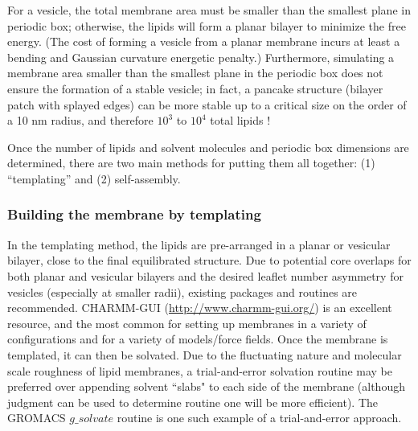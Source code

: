 \documentclass[9pt,bestpractices]{livecoms}
\begin{document}
For a vesicle, the total membrane area must be smaller than the smallest plane in periodic box; otherwise, the lipids will form a planar bilayer to minimize the free energy.
(The cost of forming a vesicle from a planar membrane incurs at least a bending and Gaussian curvature energetic penalty.)
Furthermore, simulating a membrane area smaller than the smallest plane in the periodic box does not ensure the formation of a stable vesicle; in fact, a pancake structure (bilayer patch with splayed edges) can be more stable up to a critical size on the order of a 10 nm radius, and therefore $10^3$ to $10^4$  total lipids \cite{Deserno2009}!

Once the number of lipids and solvent molecules and periodic box dimensions are determined, there are two main methods for putting them all together: (1) ``templating'' and (2) self-assembly.

\subsubsection{Building the membrane by templating}
\label{subsubsec:templating}
In the templating method, the lipids are pre-arranged in a planar or vesicular bilayer, close to the final equilibrated structure.
Due to potential core overlaps for both planar and vesicular bilayers and the desired leaflet number asymmetry for vesicles (especially at smaller radii), existing packages and routines are recommended.
CHARMM-GUI (\url{http://www.charmm-gui.org/}) is an excellent resource, and the most common for setting up membranes in a variety of configurations and for a variety of models/force fields.
Once the membrane is templated, it can then be solvated.
Due to the fluctuating nature and molecular scale roughness of lipid membranes, a trial-and-error solvation routine may be preferred over appending solvent ``slabs" to each side of the membrane (although judgment can be used to determine routine one will be more efficient).
The GROMACS $g\_solvate$ routine is one such example of a trial-and-error approach.
\end{document}
